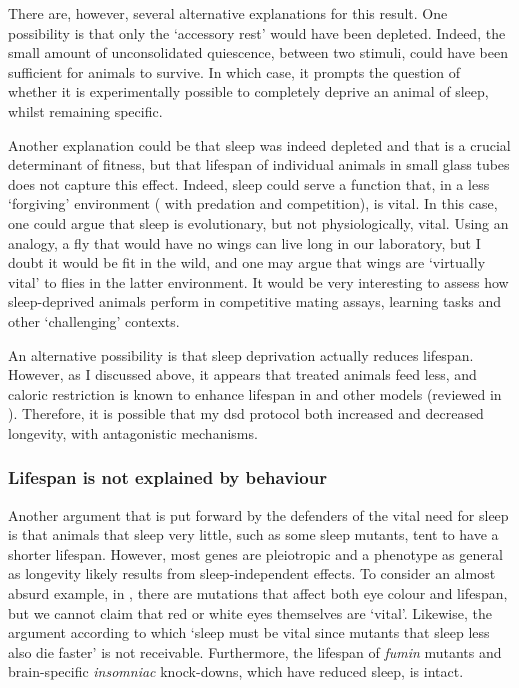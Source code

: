 There are, however, several alternative explanations for this result.
One possibility  is that only the `accessory rest' would have been depleted.
Indeed, the small amount of unconsolidated quiescence, between two stimuli, could have been sufficient for animals to survive. 
In which case, it prompts the question of whether it is experimentally possible to completely deprive an animal of sleep, whilst remaining specific.

Another explanation could be that sleep was indeed depleted and that is a crucial determinant of fitness, 
but that lifespan of individual animals in small glass tubes does not capture this effect. 
Indeed, sleep could serve a function that, in a less `forgiving' environment (\eg{} with predation and competition), is vital.
In this case, one could argue that sleep is evolutionary, but not physiologically, vital.
Using an analogy, a fly that would have no wings can live long in our laboratory, 
but I doubt it would be fit in the wild, and one may argue that wings are `virtually vital' to flies in the latter environment.
It would be very interesting to assess how sleep-deprived animals perform in competitive mating assays, learning tasks and other `challenging' contexts.

An alternative possibility is that sleep deprivation actually reduces lifespan. 
However, as I discussed above, it appears that treated animals feed less, and caloric restriction is known to enhance lifespan in \droso{} and other models (reviewed in \cite{masoro_overview_2005}).
Therefore, it is possible that my \gls{dsd} protocol both increased and decreased longevity, with antagonistic mechanisms.

\subsubsection{Lifespan is not explained by behaviour}

Another argument that is put forward by the defenders of the vital need for sleep is that animals that sleep very little, such as some sleep mutants, tent to have a shorter lifespan\cite{cirelli_reduced_2005,koh_identification_2008, cirelli_is_2008,bushey_sleep_2011,stavropoulos_insomniac_2011}.
However, most genes are pleiotropic and a phenotype as general as longevity likely results from sleep-independent effects.
To consider an almost absurd example, in \droso{}, there are mutations that affect both eye colour and lifespan, 
but we cannot claim that red or white eyes themselves are `vital'\cite{oxenkrug_extended_2010}.
Likewise, the argument according to which `sleep must be vital since mutants that sleep less also die faster' is not receivable.
Furthermore, the lifespan of \emph{fumin} mutants and brain-specific \emph{insomniac} knock-downs, which have reduced sleep, is intact\cite{kume_dopamine_2005,stavropoulos_insomniac_2011}.

